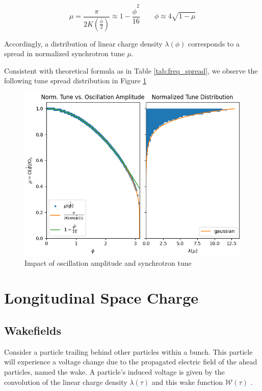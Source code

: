 \begin{equation}
    \mu =\frac{\pi}{2K(\frac{\hat{\phi}}{2})} \approx 1-\frac{\hat{\phi}^2}{16} \qquad \phi \approx 4\sqrt{1-\mu}
    \label{eq:tune_spread}
\end{equation}

Accordingly, a distribution of linear charge density $\lambda(\phi)$ corresponds to a spread in normalized synchrotron tune $\mu$.



Consistent with theoretical formula as in Table \ref{tab:freq_spread}, we observe the following tune spread distribution in Figure \ref{fig:tune_spread}

\begin{figure}
    \centering
    \includegraphics{figs/single_particle_motion/normalized_tune.png}
    \caption{Impact of oscillation amplitude and synchrotron tune}
    \label{fig:tune_spread}
\end{figure}

\section{Longitudinal Space Charge}

\subsection{Wakefields}

Consider a particle trailing behind other particles within a bunch. This particle will experience a voltage change due to the propagated electric field of the ahead particles, named the wake. A particle's induced voltage is given by the convolution of the linear charge density $\lambda(\tau)$ and this wake function $\mathcal{W}(\tau)$ \cite{wiedemann_particle_2015}\cite{zotter_impedances_1998}.


